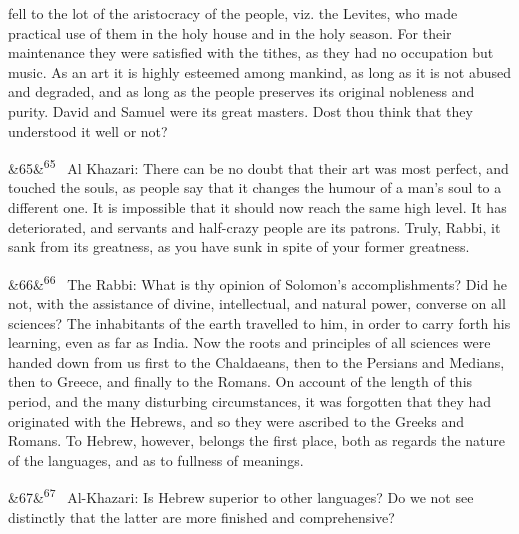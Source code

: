 \documentclass[12pt]{article}
\newcommand{\para}[1][]{\par\noindent\ifx&#1&\else\textsuperscript{\footnotesize #1}~\fi}
\begin{document}
fell to the lot of the aristocracy of the people, viz. the Levites, who made practical use of them in the holy house and in the holy season. For their maintenance they were satisfied with the tithes, as they had no occupation but music. As an art it is highly esteemed among mankind, as long as it is not abused and degraded, and as long as the people preserves its original nobleness and purity. David and Samuel were its great masters. Dost thou think that they understood it well or not?

\para[65] Al Khazari: There can be no doubt that their art was most perfect, and touched the souls, as people say that it changes the humour of a man's soul to a different one. It is impossible that it should now reach the same high level. It has deteriorated, and servants and half-crazy people are its patrons. Truly, Rabbi, it sank from its greatness, as you have sunk in spite of your former greatness.

\para[66] The Rabbi: What is thy opinion of Solomon's accomplishments? Did he not, with the assistance of divine, intellectual, and natural power, converse on all sciences? The inhabitants of the earth travelled to him, in order to carry forth his learning, even as far as India. Now the roots and principles of all sciences were handed down from us first to the Chaldaeans, then to the Persians and Medians, then to Greece, and finally to the Romans. On account of the length of this period, and the many disturbing circumstances, it was forgotten that they had originated with the Hebrews, and so they were ascribed to the Greeks and Romans. To Hebrew, however, belongs the first place, both as regards the nature of the languages, and as to fullness of meanings.

\para[67] Al-Khazari: Is Hebrew superior to other languages? Do we not see distinctly that the latter are more finished and comprehensive?
\end{document}

